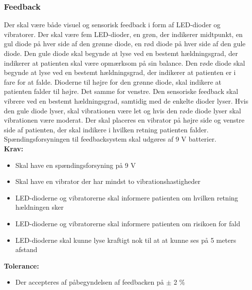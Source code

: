 \subsubsection{Feedback}
Der skal være både visuel og sensorisk feedback i form af LED-dioder og vibratorer. Der skal være fem LED-dioder, en grøn, der indikerer midtpunkt, en gul diode på hver side af den grønne diode, en rød diode på hver side af den gule diode. Den gule diode skal begynde at lyse ved en bestemt hældningsgrad, der indikerer at patienten skal være opmærksom på sin balance. Den røde diode skal begynde at lyse ved en bestemt hældningsgrad, der indikerer at patienten er i fare for at falde. Dioderne til højre for den grønne diode, skal indikere at patienten falder til højre. Det samme  for venstre. Den sensoriske feedback skal vibrere ved en bestemt hældningsgrad, samtidig med de enkelte dioder lyser. Hvis den gule diode lyser, skal vibrationen være let og hvis den røde diode lyser skal vibrationen være moderat. Der skal placeres en vibrator på højre side og venstre side af patienten, der skal indikere i hvilken retning patienten falder. Spændingsforsyningen til feedbacksystem skal udgøres af 9 V batterier. \\
\textbf{Krav:}
\begin{itemize}
\item Skal have en spændingsforsyning på 9 V
\item Skal have en vibrator der har mindst to vibrationshastigheder
\item LED-dioderne og vibratorerne skal informere patienten om hvilken retning hældningen sker
\item LED-dioderne og vibratorerne skal informere patienten om risikoen for fald
\item LED-dioderne skal kunne lyse kraftigt nok til at at kunne ses på 5 meters afstand
\end{itemize}
\textbf{Tolerance:}
\begin{itemize}
\item Der accepteres af påbegyndelsen af feedbacken på $\pm$ 2 \%
\end{itemize}

